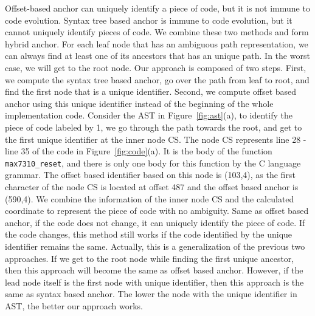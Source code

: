 Offset-based anchor can uniquely identify a piece of code, but it is not immune to code evolution.
Syntax tree based anchor is immune to code evolution, but it cannot uniquely identify pieces of code.
We combine these two methods and form hybrid anchor.
For each leaf node that has an ambiguous path representation,
we can always find at least one of its ancestors that has an unique path.
In the worst case, we will get to the root node.
Our approach is composed of two steps.
First, we compute the syntax tree based anchor, go over the path from leaf to root, and find the first node that is a unique identifier.
Second, we compute offset based anchor using this unique identifier instead of the beginning of the whole implementation code.
Consider the AST in Figure~\ref{fig:ast}(a), to identify the piece of code labeled by 1,
we go through the path towards the root,
and get to the first unique identifier at the inner node CS.
The node CS represents line 28 - line 35 of the code in Figure~\ref{fig:code}(a).
It is the body of the function \texttt{max7310\_reset}, and there is only one body for this function by the C language grammar.
The offset based identifier based on this node is (103,4), as the first character of the node CS is located at offset 487 and the offset based anchor is (590,4).
We combine the information of the inner node CS and the calculated coordinate to represent the piece of code with no ambiguity.
Same as offset based anchor, if the code does not change, it can uniquely identify the piece of code.
If the code changes, this method still works if the code identified by the unique identifier remains the same.
Actually, this is a generalization of the previous two approaches.
If we get to the root node while finding the first unique ancestor, then this approach will become the same as offset based anchor.
However, if the lead node itself is the first node with unique identifier, then this approach is the same as syntax based anchor.
The lower the node with the unique identifier in AST, the better our approach works.

